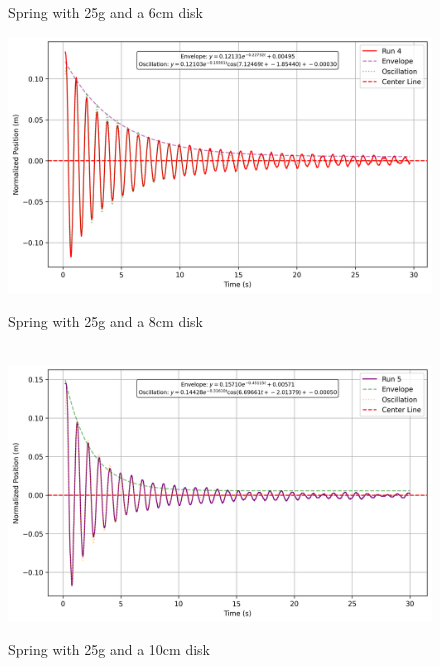 \documentclass[12pt,letterpaper]{article}
\begin{document}
\begin{figure}[H]
  \caption{Spring with 25g and a 6cm disk}\label{fig:6cm}
\endminipage\hfill
{}
  \includegraphics[width=\linewidth]{images/8cm.png}
  \caption{Spring with 25g and a 8cm disk}\label{fig:8cm}
\endminipage\hfill
\\
  \includegraphics[width=\linewidth]{images/10cm.png}
  \caption{Spring with 25g and a 10cm disk}\label{fig:10cm}
\endminipage
\end{figure}
\end{document}
